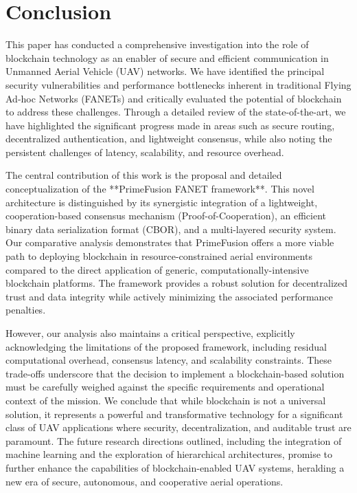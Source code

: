 \section{Conclusion}
\label{sec:conclusion}

This paper has conducted a comprehensive investigation into the role of blockchain technology as an enabler of secure and efficient communication in Unmanned Aerial Vehicle (UAV) networks. We have identified the principal security vulnerabilities and performance bottlenecks inherent in traditional Flying Ad-hoc Networks (FANETs) and critically evaluated the potential of blockchain to address these challenges. Through a detailed review of the state-of-the-art, we have highlighted the significant progress made in areas such as secure routing, decentralized authentication, and lightweight consensus, while also noting the persistent challenges of latency, scalability, and resource overhead.

The central contribution of this work is the proposal and detailed conceptualization of the **PrimeFusion FANET framework**. This novel architecture is distinguished by its synergistic integration of a lightweight, cooperation-based consensus mechanism (Proof-of-Cooperation), an efficient binary data serialization format (CBOR), and a multi-layered security system. Our comparative analysis demonstrates that PrimeFusion offers a more viable path to deploying blockchain in resource-constrained aerial environments compared to the direct application of generic, computationally-intensive blockchain platforms. The framework provides a robust solution for decentralized trust and data integrity while actively minimizing the associated performance penalties.

However, our analysis also maintains a critical perspective, explicitly acknowledging the limitations of the proposed framework, including residual computational overhead, consensus latency, and scalability constraints. These trade-offs underscore that the decision to implement a blockchain-based solution must be carefully weighed against the specific requirements and operational context of the mission. We conclude that while blockchain is not a universal solution, it represents a powerful and transformative technology for a significant class of UAV applications where security, decentralization, and auditable trust are paramount. The future research directions outlined, including the integration of machine learning and the exploration of hierarchical architectures, promise to further enhance the capabilities of blockchain-enabled UAV systems, heralding a new era of secure, autonomous, and cooperative aerial operations.

